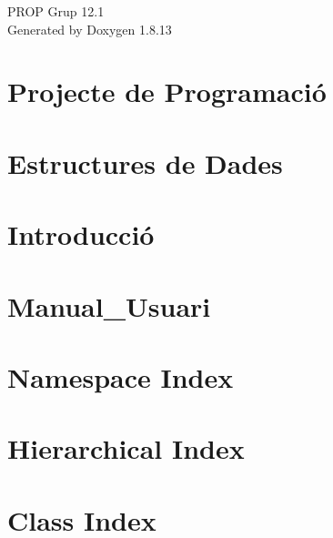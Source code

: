 \documentclass[twoside]{book}
\newcommand{\+}{\discretionary{\mbox{\scriptsize$\hookleftarrow$}}{}{}}
\newcommand{\clearemptydoublepage}{%
  \newpage{\pagestyle{empty}\cleardoublepage}%
}
\begin{document}
\hypersetup{pageanchor=false,
             bookmarksnumbered=true,
             pdfencoding=unicode
            }
\begin{titlepage}
\vspace*{7cm}
\begin{center}%
{\Large P\+R\+OP Grup 12.1 }\\
\vspace*{1cm}
{\large Generated by Doxygen 1.8.13}\\
\end{center}
\end{titlepage}
\clearemptydoublepage
{}
\tableofcontents
\clearemptydoublepage
{}
\hypersetup{pageanchor=true}

\chapter{Projecte de Programació}
\label{index}\hypertarget{index}{}
\chapter{Estructures de Dades}
\label{md_docs_HARDCODE_EDA}

\chapter{Introducció}
\label{md_docs_HARDCODE_Jocs_de_proves}

\chapter{Manual\+\_\+\+Usuari}
\label{md_docs_HARDCODE_Manual_Usuari}

\chapter{Namespace Index}

\chapter{Hierarchical Index}

\chapter{Class Index}

\end{document}
